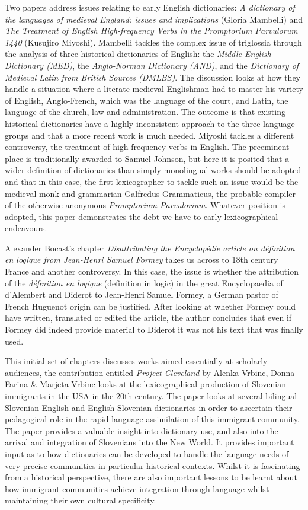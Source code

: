 \documentclass[output=paper]{langscibook}
\begin{document}
Two papers address issues relating to early English dictionaries: \textit{A dictionary of the languages of medieval England: issues and implications} (Gloria Mambelli) and \textit{The Treatment of English High-frequency Verbs in the Promptorium Parvulorum 1440} (Kusujiro Miyoshi). Mambelli tackles the complex issue of triglossia through the analysis of three historical dictionaries of English: the \textit{Middle English Dictionary (MED)}, the \textit{Anglo-Norman Dictionary (AND)}, and the \textit{Dictionary of Medieval Latin from British Sources (DMLBS)}. The discussion looks at how they handle a situation where a literate medieval Englishman had to master his variety of English, Anglo-French, which was the language of the court, and Latin, the language of the church, law and administration. The outcome is that existing historical dictionaries have a highly inconsistent approach to the three language groups and that a more recent work is much needed. Miyoshi tackles a different controversy, the treatment of high-frequency verbs in English. The preeminent place is traditionally awarded to Samuel Johnson, but here it is posited that a wider definition of dictionaries than simply monolingual works should be adopted and that in this case, the first lexicographer to tackle such an issue would be the medieval monk and grammarian Galfredus Grammaticus, the probable compiler of the otherwise anonymous \textit{Promptorium Parvulorium}. Whatever position is adopted, this paper demonstrates the debt we have to early lexicographical endeavours.

Alexander Bocast's chapter \textit{Disattributing the Encyclopédie article on  définition en logique from Jean-Henri Samuel Formey} takes us across to 18th century France and another controversy. In this case, the issue is  whether the attribution of the \textit{définition en loqique}  (definition in logic) in the great Encyclopaedia of d'Alembert and Diderot to Jean-Henri Samuel Formey, a German pastor of French Huguenot origin can be justified. After looking at whether Formey could have written, translated or edited the article, the author concludes that even if Formey did indeed provide material to Diderot it was not his text that was finally used. 

This initial set of chapters discusses works aimed essentially at scholarly audiences, the contribution entitled \textit{Project Cleveland} by Alenka Vrbinc, Donna Farina \& Marjeta Vrbinc looks at the lexicographical production of Slovenian immigrants in the USA in the 20th century. The paper looks at several bilingual Slovenian-English and English-Slovenian dictionaries in order to ascertain their pedagogical role in the rapid language assimilation of this immigrant community. The paper provides a valuable insight into dictionary use, and also into the arrival and integration of Slovenians into the New World. It provides important input as to how dictionaries can be developed to handle the language needs of very precise communities in particular historical contexts. Whilst it is fascinating from a historical perspective, there are also important lessons to be learnt about how immigrant communities achieve integration through language whilst maintaining their own cultural specificity.
\end{document}
